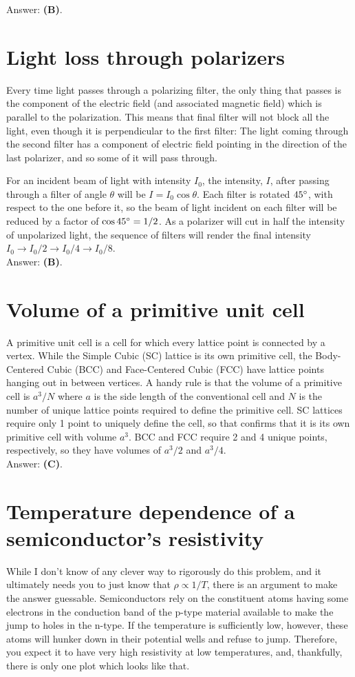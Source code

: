 \documentclass[11pt]{paper}
\newcommand{\answer}[1]{Answer: \textbf{(#1)}.}
\begin{document}
\answer{B}

\section{Light loss through polarizers}
Every time light passes through a polarizing filter, the only thing that passes is the component of the electric field (and associated magnetic field) which is parallel to the polarization.  This means that final filter will not block all the light, even though it is perpendicular to the first filter:  The light coming through the second filter has a component of electric field pointing in the direction of the last polarizer, and so some of it will pass through.

For an incident beam of light with intensity $I_0$, the intensity, $I$, after passing through a filter of angle $\theta$ will be  $I = I_0 \cos{\theta}$.  Each filter is rotated $45\degree$, with respect to the one before it, so the beam of light incident on each filter will be reduced by a factor of $\cos{45\degree} = 1/2$.  As a polarizer will cut in half the intensity of unpolarized light, the sequence of filters will render the final intensity $I_0 \rightarrow I_0/2 \rightarrow I_0/4 \rightarrow I_0/8$.\\

\answer{B}

\section{Volume of a primitive unit cell}
A primitive unit cell is a cell for which every lattice point is connected by a vertex.  While the Simple Cubic (SC) lattice is its own primitive cell, the Body-Centered Cubic (BCC) and Face-Centered Cubic (FCC) have lattice points hanging out in between vertices.  A handy rule is that the volume of a primitive cell is $a^3/N$ where $a$ is the side length of the conventional cell and $N$ is the number of unique lattice points required to define the primitive cell.  SC lattices require only 1 point to uniquely define the cell, so that confirms that it is its own primitive cell with volume $a^3$.  BCC and FCC require 2 and 4 unique points, respectively, so they have volumes of $a^3/2$ and $a^3/4$.\\

\answer{C}

\section{Temperature dependence of a semiconductor's resistivity}
While I don't know of any clever way to rigorously do this problem, and it ultimately needs you to just know that $\rho \propto 1/T$, there is an argument to make the answer guessable.  Semiconductors rely on the constituent atoms having some electrons in the conduction band of the p-type material available to make the jump to holes in the n-type.  If the temperature is sufficiently low, however, these atoms will hunker down in their potential wells and refuse to jump.  Therefore, you expect it to have very high resistivity at low temperatures, and, thankfully, there is only one plot which looks like that.\\
\end{document}
